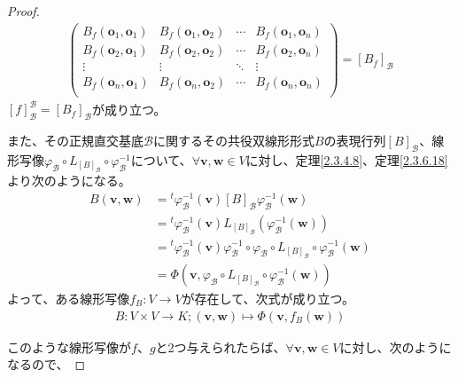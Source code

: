 \documentclass[dvipdfmx]{jsarticle}
\begin{document}
\begin{proof}
\begin{align*}
\begin{pmatrix}
B_{f}\left( \mathbf{o}_{1},\mathbf{o}_{1} \right) & B_{f}\left( \mathbf{o}_{1},\mathbf{o}_{2} \right) & \cdots & B_{f}\left( \mathbf{o}_{1},\mathbf{o}_{n} \right) \\
B_{f}\left( \mathbf{o}_{2},\mathbf{o}_{1} \right) & B_{f}\left( \mathbf{o}_{2},\mathbf{o}_{2} \right) & \cdots & B_{f}\left( \mathbf{o}_{2},\mathbf{o}_{n} \right) \\
 \vdots & \vdots & \ddots & \vdots \\
B_{f}\left( \mathbf{o}_{n},\mathbf{o}_{1} \right) & B_{f}\left( \mathbf{o}_{n},\mathbf{o}_{2} \right) & \cdots & B_{f}\left( \mathbf{o}_{n},\mathbf{o}_{n} \right) \\
\end{pmatrix} = \left[ B_{f} \right]_{\mathcal{B}}
\end{align*}
$[ f]_{\mathcal{B}}^{\mathcal{B}} = \left[ B_{f} \right]_{\mathcal{B}}$が成り立つ。\par
また、その正規直交基底$\mathcal{B}$に関するその共役双線形形式$B$の表現行列$[ B]_{\mathcal{B}}$、線形写像$\varphi_{\mathcal{B}} \circ L_{[ B]_{\mathcal{B}}} \circ \varphi_{\mathcal{B}}^{- 1}$について、$\forall\mathbf{v},\mathbf{w} \in V$に対し、定理\ref{2.3.4.8}、定理\ref{2.3.6.18}より次のようになる。
\begin{align*}
B\left( \mathbf{v},\mathbf{w} \right) &={}^{t}\varphi_{\mathcal{B}}^{- 1}\left( \mathbf{v} \right)[ B]_{\mathcal{B}}\varphi_{\mathcal{B}}^{- 1}\left( \mathbf{w} \right)\\
&={}^{t}\varphi_{\mathcal{B}}^{- 1}\left( \mathbf{v} \right)L_{[ B]_{\mathcal{B}}}\left( \varphi_{\mathcal{B}}^{- 1}\left( \mathbf{w} \right) \right)\\
&={}^{t}\varphi_{\mathcal{B}}^{- 1}\left( \mathbf{v} \right)\varphi_{\mathcal{B}}^{- 1} \circ \varphi_{\mathcal{B}} \circ L_{[ B]_{\mathcal{B}}} \circ \varphi_{\mathcal{B}}^{- 1}\left( \mathbf{w} \right)\\
&= \varPhi\left( \mathbf{v},\varphi_{\mathcal{B}} \circ L_{[ B]_{\mathcal{B}}} \circ \varphi_{\mathcal{B}}^{- 1}\left( \mathbf{w} \right) \right)
\end{align*}
よって、ある線形写像$f_{B}:V \rightarrow V$が存在して、次式が成り立つ。
\begin{align*}
B:V \times V \rightarrow K;\left( \mathbf{v},\mathbf{w} \right) \mapsto \varPhi\left( \mathbf{v},f_{B}\left( \mathbf{w} \right) \right)
\end{align*}\par
このような線形写像が$f$、$g$と2つ与えられたらば、$\forall\mathbf{v},\mathbf{w} \in V$に対し、次のようになるので、

\end{proof}
\end{document}
